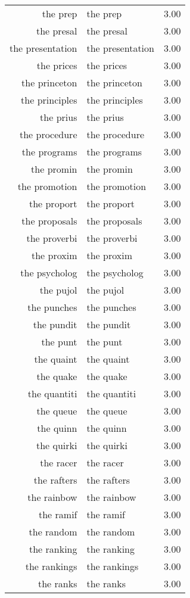 \begin{table}[ht]
\begin{tabular}{rlr}
  the prep & the prep & 3.00 \\ 
  the presal & the presal & 3.00 \\ 
  the presentation & the presentation & 3.00 \\ 
  the prices & the prices & 3.00 \\ 
  the princeton & the princeton & 3.00 \\ 
  the principles & the principles & 3.00 \\ 
  the prius & the prius & 3.00 \\ 
  the procedure & the procedure & 3.00 \\ 
  the programs & the programs & 3.00 \\ 
  the promin & the promin & 3.00 \\ 
  the promotion & the promotion & 3.00 \\ 
  the proport & the proport & 3.00 \\ 
  the proposals & the proposals & 3.00 \\ 
  the proverbi & the proverbi & 3.00 \\ 
  the proxim & the proxim & 3.00 \\ 
  the psycholog & the psycholog & 3.00 \\ 
  the pujol & the pujol & 3.00 \\ 
  the punches & the punches & 3.00 \\ 
  the pundit & the pundit & 3.00 \\ 
  the punt & the punt & 3.00 \\ 
  the quaint & the quaint & 3.00 \\ 
  the quake & the quake & 3.00 \\ 
  the quantiti & the quantiti & 3.00 \\ 
  the queue & the queue & 3.00 \\ 
  the quinn & the quinn & 3.00 \\ 
  the quirki & the quirki & 3.00 \\ 
  the racer & the racer & 3.00 \\ 
  the rafters & the rafters & 3.00 \\ 
  the rainbow & the rainbow & 3.00 \\ 
  the ramif & the ramif & 3.00 \\ 
  the random & the random & 3.00 \\ 
  the ranking & the ranking & 3.00 \\ 
  the rankings & the rankings & 3.00 \\ 
  the ranks & the ranks & 3.00 \\ 

\end{tabular}
\end{table}
